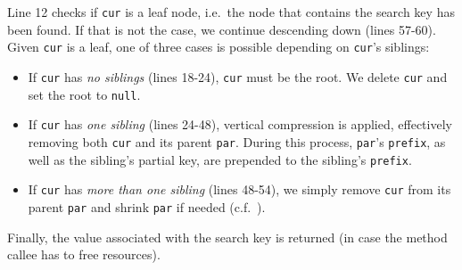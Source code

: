 \documentclass[abstracton,12pt]{scrartcl}
\theoremstyle{definition}
\begin{document}
Line 12 checks if \texttt{cur} is a leaf node, i.e.\ the node that contains 
the search key has been found. If that is not the case, we
continue descending down (lines 57-60). Given \texttt{cur} is a leaf, one
of three cases is possible depending on \texttt{cur}'s siblings:

\begin{itemize}
  \item If \texttt{cur} has \textit{no siblings} (lines 18-24), \texttt{cur}
    must be the root. We delete \texttt{cur} and set the root to \texttt{null}.

  \item If \texttt{cur} has \textit{one sibling} (lines 24-48), vertical
    compression is applied, effectively removing both \texttt{cur} and its
    parent \texttt{par}. During this process, \texttt{par}'s \texttt{prefix},
    as well as the sibling's partial key, are prepended to the sibling's
    \texttt{prefix}.

  \item If \texttt{cur} has \textit{more than one sibling} (lines 48-54),
    we simply remove \texttt{cur} from its parent \texttt{par} and shrink
    \texttt{par} if needed (c.f.\ ).
\end{itemize}

Finally, the value associated with the search key is returned (in case the
method callee has to free resources).
\end{document}
